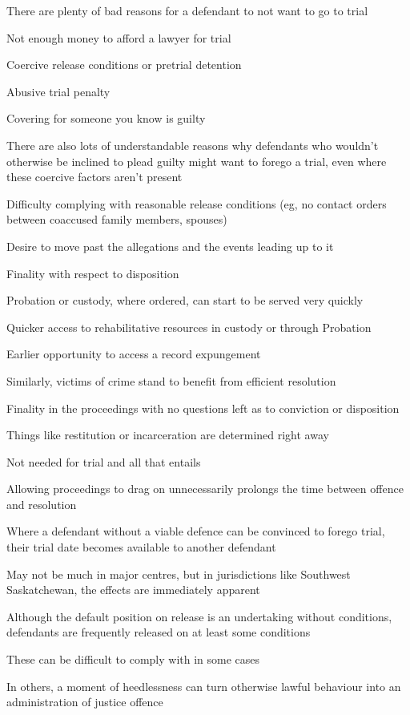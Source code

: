 There are plenty of bad reasons for a defendant to not want to go to trial

Not enough money to afford a lawyer for trial

Coercive release conditions or pretrial detention

Abusive trial penalty

Covering for someone you know is guilty

There are also lots of understandable reasons why defendants who wouldn't otherwise be inclined to plead guilty might want to forego a trial, even where these coercive factors aren't present

Difficulty complying with reasonable release conditions (eg, no contact orders between coaccused family members, spouses)

Desire to move past the allegations and the events leading up to it

Finality with respect to disposition

Probation or custody, where ordered, can start to be served very quickly

Quicker access to rehabilitative resources in custody or through Probation

Earlier opportunity to access a record expungement

Similarly, victims of crime stand to benefit from efficient resolution

Finality in the proceedings with no questions left as to conviction or disposition

Things like restitution or incarceration are determined right away

Not needed for trial and all that entails

Allowing proceedings to drag on unnecessarily prolongs the time between offence and resolution

Where a defendant without a viable defence can be convinced to forego trial, their trial date becomes available to another defendant

May not be much in major centres, but in jurisdictions like Southwest Saskatchewan, the effects are immediately apparent

Although the default position on release is an undertaking without conditions, defendants are frequently released on at least some conditions

These can be difficult to comply with in some cases

In others, a moment of heedlessness can turn otherwise lawful behaviour into an administration of justice offence

